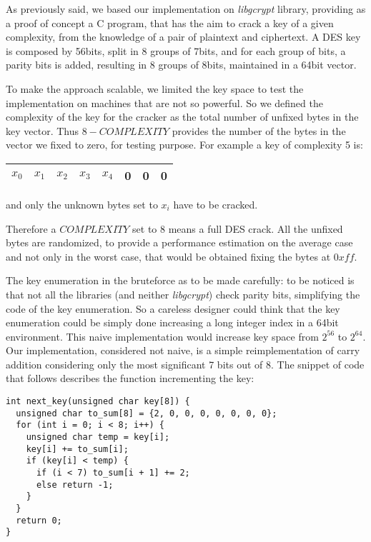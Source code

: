 \documentclass[11pt]{article}
\begin{document}
  As previously said, we based our implementation on \textit{libgcrypt} \cite{libgcrypt} library, providing as a proof of concept a C program, that has the aim to crack a key of a given complexity, from the knowledge of a pair of plaintext and ciphertext. A DES key is composed by 56bits, split in 8 groups of 7bits, and for each group of bits, a parity bits is added, resulting in 8 groups of 8bits, maintained in a 64bit vector.

  To make the approach scalable, we limited the key space to test the implementation on machines that are not so powerful. So we defined the complexity of the key for the cracker as the total number of unfixed bytes in the key vector. Thus $8 - COMPLEXITY$ provides the number of the bytes in the vector we fixed to zero, for testing purpose.
  For example a key of complexity 5 is:
  \begin{center}
    \begin{tabular}{ | c | c | c | c | c | c | c | c |}
      \hline
      $x_0$ & $x_1$ & $x_2$ & $x_3$ & $x_4$ & 0 & 0 & 0 \\
      \hline
    \end{tabular}
  \end{center}
  and only the unknown bytes set to $x_i$ have to be cracked.

  Therefore a $COMPLEXITY$ set to 8 means a full DES crack. All the unfixed bytes are randomized, to provide a performance estimation on the average case and not only in the worst case, that would be obtained fixing the bytes at $0xff$.

  The key enumeration in the bruteforce as to be made carefully: to be noticed is that not all the libraries (and neither \textit{libgcrypt}) check parity bits, simplifying the code of the key enumeration. So a careless designer could think that the key enumeration could be simply done increasing a long integer index in a 64bit environment. This naive implementation would increase key space from $2^{56}$ to $2^{64}$.
  Our implementation, considered not naive, is a simple reimplementation of carry addition considering only the most significant 7 bits out of 8. The snippet of code that follows describes the function incrementing the key:
  \bigskip
  \begin{verbatim}
int next_key(unsigned char key[8]) {
  unsigned char to_sum[8] = {2, 0, 0, 0, 0, 0, 0, 0};
  for (int i = 0; i < 8; i++) {
    unsigned char temp = key[i];
    key[i] += to_sum[i];
    if (key[i] < temp) {
      if (i < 7) to_sum[i + 1] += 2;
      else return -1;
    }
  }
  return 0;
}
  \end{verbatim}
\end{document}
